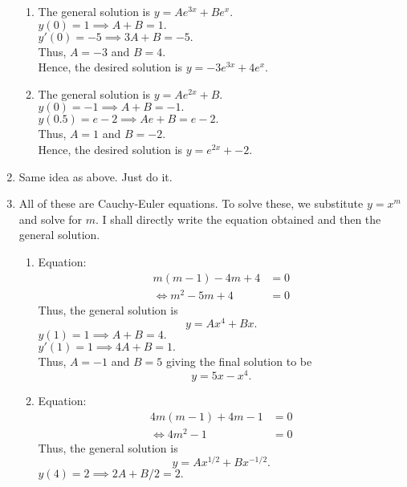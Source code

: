 \documentclass[12pt]{article}
\theoremstyle{definition}
\numberwithin{thm}{section}
\begin{document}
\begin{enumerate}[leftmargin=*, label = Q.\arabic*.]
	\begin{enumerate}[label = (\roman*)] 
		\item The general solution is $y = Ae^{3x} + Be^x.$\\
		$y(0) = 1 \implies A + B = 1.$\\
		$y'(0) = -5 \implies 3A + B = -5.$\\
		Thus, $A = -3$ and $B = 4.$\\
		Hence, the desired solution is $y = -3e^{3x} + 4e^x.$
		\item The general solution is $y = Ae^{2x} + B.$\\
		$y(0) = -1 \implies A + B = -1.$\\
		$y(0.5) = e - 2 \implies Ae + B = e-2.$\\
		Thus, $A = 1$ and $B = -2.$\\
		Hence, the desired solution is $y = e^{2x} + -2.$
	\end{enumerate}
	\item Same idea as above. Just do it. \checkmark
	\item \label{q8} All of these are Cauchy-Euler equations. To solve these, we substitute $y = x^m$ and solve for $m.$ I shall directly write the equation obtained and then the general solution.
	\begin{enumerate}[label = (\roman*)] 
		\item Equation:
		\begin{align*} 
			m(m - 1) - 4m + 4 &= 0\\
			\iff m^2 - 5m + 4 &= 0
		\end{align*}
		Thus, the general solution is
		\begin{equation*} 
			y = Ax^4 + Bx.
		\end{equation*}
		$y(1) = 1 \implies A + B = 4.$\\
		$y'(1) = 1 \implies 4A + B = 1.$\\
		Thus, $A = -1$ and $B = 5$ giving the final solution to be
		\begin{equation*} 
			y = 5x -x^4.
		\end{equation*}
		\item Equation:
		\begin{align*} 
			4m(m - 1) + 4m - 1 &= 0\\
			\iff 4m^2 - 1 &= 0
		\end{align*}
		Thus, the general solution is
		\begin{equation*} 
			y = Ax^{1/2} + Bx^{-1/2}.
		\end{equation*}
		$y(4) = 2 \implies 2A + B/2 = 2.$\\

\end{enumerate}
\end{enumerate}
\end{document}
